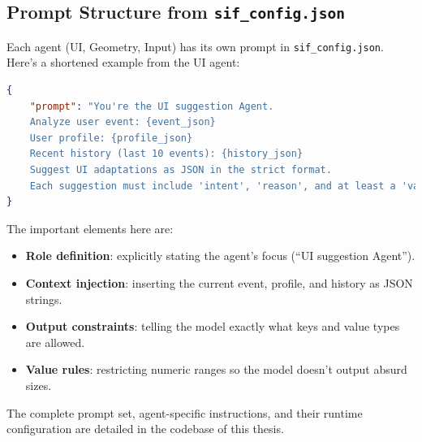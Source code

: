 \documentclass[openany]{book}
\begin{document}
\subsection{Prompt Structure from \texttt{sif\_config.json}}
Each agent (UI, Geometry, Input) has its own prompt in \texttt{sif\_config.json}.\\
Here’s a shortened example from the UI agent:
\begin{lstlisting}[caption=Example UI Agent Prompt, language=json]
{
    "prompt": "You're the UI suggestion Agent.  
    Analyze user event: {event_json}  
    User profile: {profile_json}  
    Recent history (last 10 events): {history_json}  
    Suggest UI adaptations as JSON in the strict format.  
    Each suggestion must include 'intent', 'reason', and at least a 'value' and 'mode' field. Value must be a reasonable number (e.g., 1.2) with at most one decimal place, and represents a scaling value unless stated otherwise in the metadata (e.g. font size). Target can be 'all' or specific elements."
}
\end{lstlisting}
The important elements here are:
\begin{itemize}
    \item \textbf{Role definition}: explicitly stating the agent’s focus (“UI suggestion Agent”).
    \item \textbf{Context injection}: inserting the current event, profile, and history as JSON strings.
    \item \textbf{Output constraints}: telling the model exactly what keys and value types are allowed.
    \item \textbf{Value rules}: restricting numeric ranges so the model doesn’t output absurd sizes.
\end{itemize}
The complete prompt set, agent-specific instructions, and their runtime configuration are detailed in the codebase of this thesis.
\end{document}
